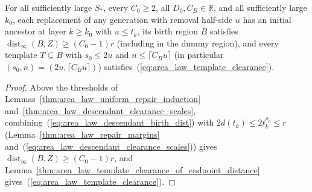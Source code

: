 \begin{lemma}
    \label{thm:area_law_descendant_birth_template_clearance}
    \leanok
    For all sufficiently large $S_*$, every $C_0\ge2$, all $D_0,C_B\in\mathbb R$,
    and all sufficiently large $k_0$, each replacement of any generation with
    removal half-side $u$ has an initial ancestor at layer $k\ge k_0$ with
    $u\le t_k$, its birth region $B$ satisfies
    $\operatorname{dist}_\infty(B,Z)\ge(C_0-1)r$ (including in the dummy
    region), and every template $T\subseteq B$ with $s_0\le2u$ and
    $n\le\lceil C_Bu\rceil$ (in particular $(s_0,n)=(2u,\lceil C_Bu\rceil)$)
    satisfies~(\ref{eq:area_law_template_clearance}).
\end{lemma}
\begin{proof}\leanok
    Above the thresholds of Lemmas~\ref{thm:area_law_uniform_repair_induction}
    and~\ref{thm:area_law_descendant_clearance_scales}, combining~(\ref{eq:area_law_descendant_birth_dist})
    with $2d(t_k)\le2t_k^{\rho_0}\le r$ (Lemma~\ref{thm:area_law_repair_margins}
    and~(\ref{eq:area_law_descendant_clearance_scales})) gives
    $\operatorname{dist}_\infty(B,Z)\ge(C_0-1)r$, and
    Lemma~\ref{thm:area_law_template_clearance_of_endpoint_distance} gives~(\ref{eq:area_law_template_clearance}).
\end{proof}
